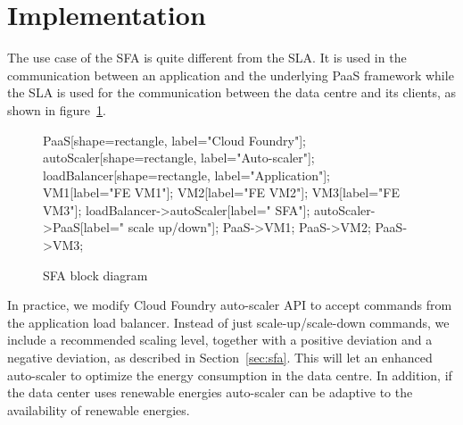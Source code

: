 \section{Implementation}
\label{sec:implem}

The use case of the SFA is quite different from the SLA. 
It is used in the communication between an application and the underlying PaaS framework while the SLA is used for the communication between the data centre and its clients, as shown in figure~\ref{fig:SFABlock}.

\begin{figure}[h]
\label{fig:SFABlock}
\centering
{}
{
   PaaS[shape=rectangle, label="Cloud Foundry"];
   autoScaler[shape=rectangle, label="Auto-scaler"];
   loadBalancer[shape=rectangle, label="Application"];
   VM1[label="FE VM1"];
   VM2[label="FE VM2"];
   VM3[label="FE VM3"];
   loadBalancer->autoScaler[label=" SFA"];
   autoScaler->PaaS[label=" scale up/down"];
   PaaS->VM1;
   PaaS->VM2;
   PaaS->VM3;
}
\caption{SFA block diagram}
\end{figure}

In practice, we modify Cloud Foundry auto-scaler API to accept commands from the application load balancer.
Instead of just scale-up/scale-down commands, we include a recommended scaling level, together with a positive deviation and a negative deviation, as described in Section~\ref{sec:sfa}.
This will let an enhanced auto-scaler to optimize the energy consumption in the data centre. In addition, if the data center uses renewable energies auto-scaler can be adaptive to the availability of renewable energies.